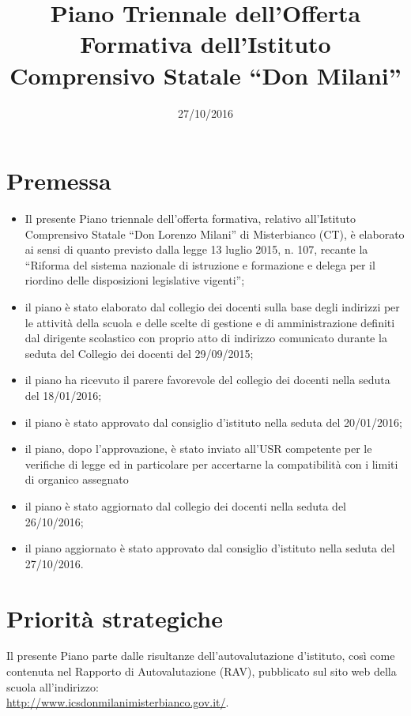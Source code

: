\documentclass[12pt,a4paper,oneside]{memoir}
\title{Piano Triennale dell'Offerta Formativa dell'Istituto Comprensivo Statale ``Don Milani''}
\author{}
\date{27/10/2016} %
\begin{document}
\tableofcontents* %

\chapter*{Premessa}

\begin{itemize}
\item Il presente Piano triennale dell'offerta formativa, relativo all'Istituto Comprensivo Statale ``Don Lorenzo Milani'' di Misterbianco (CT), è elaborato ai sensi di quanto previsto dalla legge 13 luglio 2015, n. 107, recante la ``Riforma del sistema nazionale di istruzione e formazione e delega per il riordino delle disposizioni legislative vigenti'';
\item il piano è stato elaborato dal collegio dei docenti sulla base degli indirizzi per le attività della scuola e delle scelte di gestione e di amministrazione definiti dal dirigente scolastico con proprio atto di indirizzo comunicato durante la seduta del Collegio dei docenti del 29/09/2015;
\item il piano ha ricevuto il parere favorevole del collegio dei docenti nella seduta del 18/01/2016;
\item il piano è stato approvato dal consiglio d'istituto nella seduta del 20/01/2016;
\item il piano, dopo l'approvazione, è stato inviato all'USR competente per le verifiche di legge ed in particolare per accertarne la compatibilità con i limiti di organico assegnato
\item il piano è stato aggiornato dal collegio dei docenti nella seduta del 26/10/2016;
\item il piano aggiornato è stato approvato dal consiglio d'istituto nella seduta del 27/10/2016.
\end{itemize}

\chapter{Priorità strategiche}
Il presente Piano parte dalle risultanze dell'autovalutazione d'istituto, così come contenuta nel Rapporto di Autovalutazione (RAV), 
pubblicato sul sito web della scuola all'indirizzo:\\
\url{http://www.icsdonmilanimisterbianco.gov.it/}.\\
\end{document}
